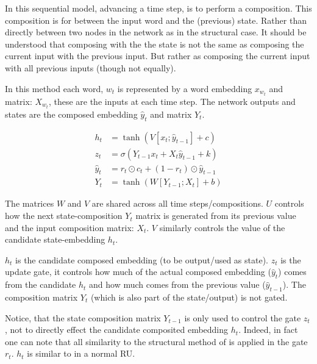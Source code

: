 \documentclass[12pt,parskip]{komatufte}
\begin{document}
In this sequential model, advancing a time step, is to perform a composition.
This composition is for between the input word and the (previous) state.
Rather than directly between two nodes in the network as in the structural case.
It should be understood that composing with the the state is not the same as composing the current input with the previous input.
But rather as composing the current input with all previous inputs (though not equally).

In this method each word, $w_t$ is represented by a word embedding $x_{w_t}$ and matrix: $X_{w_t}$, these are the inputs at each time step.
The network outputs and states are the composed embedding $\hat{y}_t$ and matrix $Y_t$.


 
\begin{align}
h_t &= \tanh\left(V[x_t; \hat{y}_{t-1}] + c \right)\\
z_t &= \sigma\left(Y_{t-1}x_t + X_t \hat{y}_{t-1} + k \right)\\
%
\hat{y}_t &= r_t \odot c_t + (1-r_t) \odot \hat{y}_{t-1} \\
Y_t &= \tanh \left( W[Y_{t-1}; X_t] + b \right)
\end{align}



The matrices $W$ and $V$ are shared across all time steps/compositions.
$U$ controls how the next state-composition $Y_t$ matrix is generated from its previous value and the input composition matrix: $X_t$.
$V$ similarly controls the value of the candidate state-embedding $h_t$.

$h_t$ is the candidate composed embedding (to be output/used as state).
$z_t$ is the update gate, it controls how much of the actual composed embedding ($\hat{y}_t$) comes from the candidate $h_t$ and how much comes from the previous value ($\hat{y}_{t-1}$).
The composition matrix $Y_t$ (which is also part of the state/output) is not gated.

Notice, that the state composition matrix $Y_{t-1}$ is only used to control the gate $z_t$, not to directly effect the candidate composited embedding $h_t$.
Indeed, in fact one can note that all similarity to the structural method of \textcite{SocherMVRNN} is applied in the gate $r_t$.
$h_t$ is similar to in a normal RU.
\end{document}
